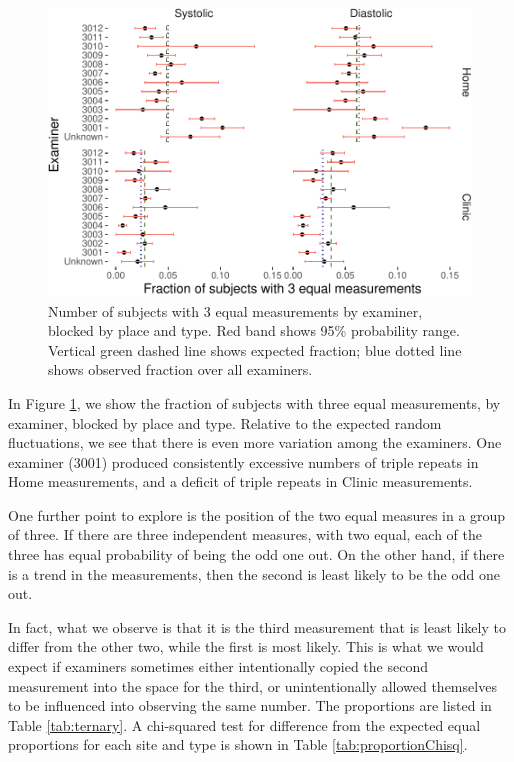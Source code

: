 \documentclass[
]{article}
\begin{document}
\begin{figure}
\centering
\includegraphics{fig_test_files/figure-latex/examinerPlot3-1.pdf}
\caption{\label{fig:examinerPlot3}Number of subjects with 3 equal measurements by examiner, blocked by place and type. Red band shows 95\% probability range. Vertical green dashed line shows expected fraction; blue dotted line shows observed fraction over all examiners.}
\end{figure}

In Figure \ref{fig:examinerPlot3}, we show the fraction of subjects with three equal measurements, by examiner, blocked by place and type.
Relative to the expected random fluctuations, we see that there is even more variation among the examiners.
One examiner (3001) produced consistently excessive numbers of triple repeats in Home measurements, and a deficit of triple repeats in Clinic measurements.

One further point to explore is the position of the two equal measures in a group of three.
If there are three independent measures, with two equal, each of the three has equal probability of being the odd one out.
On the other hand, if there is a trend in the measurements, then the second is least likely to be the odd one out.

In fact, what we observe is that it is the third measurement that is least likely to differ from the other two, while the first is most likely.
This is what we would expect if examiners sometimes either intentionally copied the second measurement into the space for the third, or unintentionally allowed themselves to be influenced into observing the same number.
The proportions are listed in Table \ref{tab:ternary}.
A chi-squared test for difference from the expected equal proportions for each site and type is shown in Table \ref{tab:proportionChisq}.
\end{document}
